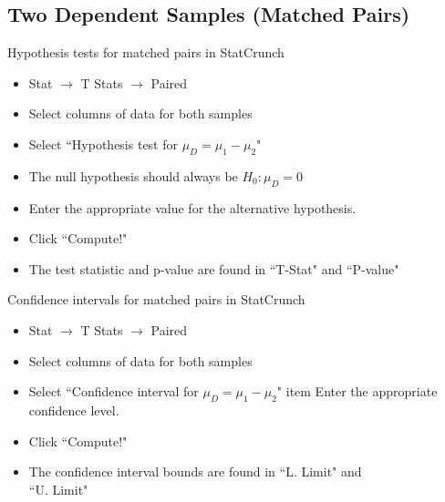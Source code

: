 \documentclass[xcolor=table]{beamer}
\begin{document}
\subsection{Two Dependent Samples (Matched Pairs)}


\begin{frame}{Hypothesis tests for matched pairs in StatCrunch}

\begin{block}{}
\large
\begin{itemize}
\item Stat $\to$ T Stats $\to$ Paired
\item Select columns of data for both samples
\item Select ``Hypothesis test for $\mu_D = \mu_1 - \mu_2$"
\item The null hypothesis should always be $H_0: \mu_D = 0$
\item Enter the appropriate value for the alternative hypothesis.
\item Click ``Compute!"
\item The test statistic and p-value are found in ``T-Stat" and ``P-value"
\end{itemize}
\end{block}

\end{frame}

\begin{frame}{Confidence intervals for matched pairs in StatCrunch}

\begin{block}{}
\begin{itemize}
\large
\item Stat $\to$ T Stats $\to$ Paired
\item Select columns of data for both samples
\item Select ``Confidence interval for $\mu_D = \mu_1 - \mu_2$"
item Enter the appropriate confidence level.
\item Click ``Compute!"
\item The confidence interval bounds are found in ``L. Limit" and\\ ``U. Limit"
\end{itemize}
\end{block}

\end{frame}
\end{document}
